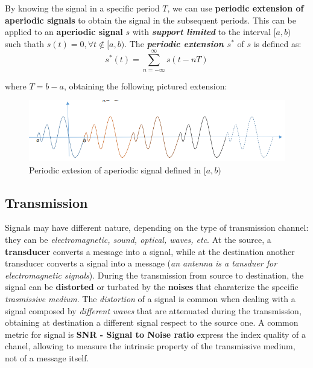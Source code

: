 \documentclass[10pt,a4paper]{report}
\theoremstyle{definition}
\begin{document}
By knowing the signal in a specific period $T$, we can use \textbf{periodic extension of aperiodic signals} to obtain the signal in the subsequent periods.  This can be applied to an \textbf{aperiodic signal} $s$ with \textit{\textbf{support limited}} to the interval $[a,b)$ such thath $s(t) = 0, \forall t \notin [a,b)$. The \textit{\textbf{periodic extension $s^{*}$}} of $s$ is defined as:
\begin{equation}
s^{*}(t) = \sum^{\infty}_{n=-\infty}s(t-nT)
\end{equation}

where $T = b-a$, obtaining the following pictured extension:
\begin{figure}[h]
	\centering\includegraphics[scale=0.50]{images/Pasted image 20230505115013.png}
	\caption{Periodic extesion of aperiodic signal defined in $[a,b)$}
	\label{periodic-extension-diagram}
\end{figure}

\subsection{Transmission}\label{sec:transmission}
Signals may have different nature, depending on the type of transmission channel: they can be \textit{electromagnetic, sound, optical, waves, etc}.
At the source, a \textbf{transducer} converts a message into a signal, while at the destination another transducer converts a signal into a message (\textit{an antenna is a tansduer for electromagnetic signals}).
During the transmission from source to destination, the signal can be \textbf{distorted} or turbated by the \textbf{noises} that charaterize the specific \textit{trasmissive medium}. The \textit{distortion} of a signal is common when dealing with a signal composed by \textit{different waves} that are attenuated during the transmission, obtaining at destination a different signal respect to the source one.
A common metric for signal is \textbf{SNR - Signal to Noise ratio} express the index quality of a chanel, allowing to measure the intrinsic property of the transmissive medium, not of a message itself.
\end{document}
